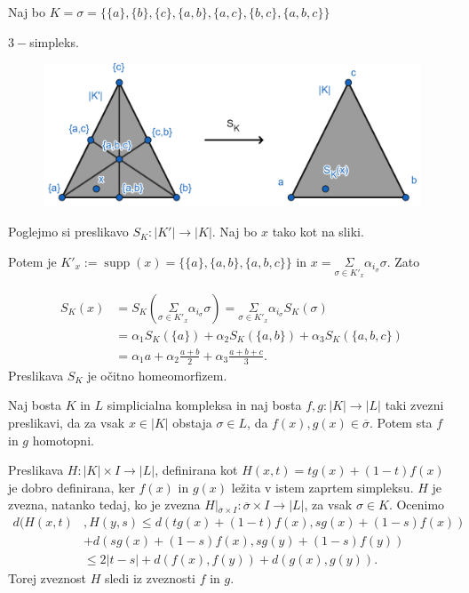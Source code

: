 \documentclass[mat1]{fmfdelo}
\DeclareMathOperator*{\supp}{supp}
\begin{document}
\begin{primer}
Naj bo $K=\sigma=\{\{a\},\{b\},\{c\},\{a,b\},\{a,c\},\{b,c\},\{a,b,c\}\}$ 

$3-$simpleks.
\begin{figure}[h]
    \centering
    \includegraphics[width=0.7\linewidth]{sk.png}
\end{figure}
Poglejmo si preslikavo $S_K: |K'| \rightarrow |K|$. Naj bo $x$ tako kot na sliki. %

Potem je 
$K'_x:=\supp(x)=\{\{a\},\{a,b\},\{a,b,c\}\}$ in $x= \underset{\sigma\in K'_x}{\Sigma} \alpha_{i_\sigma} \sigma$. Zato

\begin{align*}
S_K(x)&=S_K(\underset{\sigma\in K'_x}{\Sigma} \alpha_{i_{\sigma}} 
 \sigma) =  \underset{\sigma\in K'_x}{\Sigma} \alpha_{i_{\sigma}} 
S_K(\sigma)\\
&=\alpha_1S_K(\{a\})+\alpha_2S_K(\{a,b\})+\alpha_3S_K(\{a,b,c\}) \\ 
&=\alpha_1a+\alpha_2\frac{a+b}{2}+\alpha_3\frac{a+b+c}{3}.
\end{align*}
Preslikava $S_K$ je očitno homeomorfizem.



\end{primer}


\begin{trditev}\label{tr:shom}
    Naj bosta $K$ in $L$ simplicialna kompleksa in naj bosta $f,g:|K|\rightarrow |L|$ taki zvezni preslikavi, da za vsak $x\in |K|$ obstaja $\sigma \in L$, da $f(x),g(x) \in \overline{\sigma}.$ Potem sta $f$ in $g$ homotopni.
\end{trditev}

\begin{dokaz}
    Preslikava $H:|K|\times I\rightarrow |L|$, definirana kot $H(x,t)=tg(x) + (1-t)f(x)$ je dobro definirana, ker $f(x)$ in $g(x)$ ležita v istem zaprtem simpleksu. $H$ je zvezna, natanko tedaj, ko je zvezna $H|_{\overline{\sigma}\times I}:\overline{\sigma}\times I \rightarrow |L|$, za vsak $\sigma \in K$. Ocenimo 
\begin{align*}
    d(H(x,t)&,H(y,s)\leq d(tg(x)+(1-t)f(x),sg(x)+(1-s)f(x)) \\
&+d(sg(x)+(1-s)f(x),sg(y)+(1-s)f(y))\\
&\leq 2|t-s|+d(f(x),f(y))+d(g(x),g(y)).
\end{align*}
Torej zveznost $H$ sledi iz zveznosti $f$ in $g$.
\end{dokaz}
\end{document}
